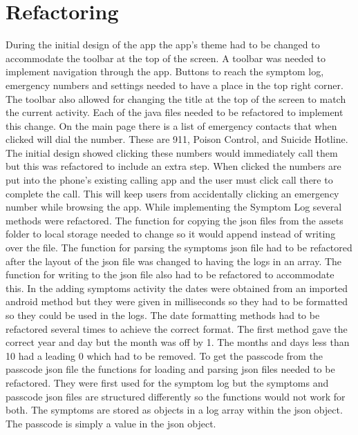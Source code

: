\documentclass[letterpaper,12pt,titlepage]{article}
\begin{document}
\section{Refactoring}
During the initial design of the app the app’s theme had to be changed to accommodate the toolbar at the top of the screen. A toolbar was needed to implement navigation through the app. Buttons to reach the symptom log, emergency numbers and settings needed to have a place in the top right corner. The toolbar also allowed for changing the title at the top of the screen to match the current activity. Each of the java files needed to be refactored to implement this change. 
\newline
\newline
On the main page there is a list of emergency contacts that when clicked will dial the number. These are 911, Poison Control, and Suicide Hotline. The initial design showed clicking these numbers would immediately call them but this was refactored to include an extra step. When clicked the numbers are put into the phone’s existing calling app and the user must click call there to complete the call. This will keep users from accidentally clicking an emergency number while browsing the app. 
\newline
\newline
While implementing the Symptom Log several methods were refactored. The function for copying the json files from the assets folder to local storage needed to change so it would append instead of writing over the file. The function for parsing the symptoms json file had to be refactored after the layout of the json file was changed to having the logs in an array. The function for writing to the json file also had to be refactored to accommodate this. 
\newline
\newline
In the adding symptoms activity the dates were obtained from an imported android method but they were given in milliseconds so they had to be formatted so they could be used in the logs. The date formatting methods had to be refactored several times to achieve the correct format. The first method gave the correct year and day but the month was off by 1. The months and days less than 10 had a leading 0 which had to be removed.
\newline
\newline
To get the passcode from the passcode json file the functions for loading and parsing json files needed to be refactored. They were first used for the symptom log but the symptoms and passcode json files are structured differently so the functions would not work for both. The symptoms are stored as objects in a log array within the json object. The passcode is simply a value in the json object. 
\end{document}

